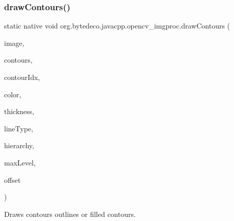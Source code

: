 \subsubsection{\texorpdfstring{draw\+Contours()}{drawContours()}}
{\footnotesize\ttfamily static native void org.\+bytedeco.\+javacpp.\+opencv\+\_\+imgproc.\+draw\+Contours (\begin{DoxyParamCaption}\item[{@By\+Val Mat}]{image,  }\item[{@By\+Val Mat\+Vector}]{contours,  }\item[{int}]{contour\+Idx,  }\item[{@Const @By\+Ref Scalar}]{color,  }\item[{int}]{thickness,  }\item[{int}]{line\+Type,  }\item[{@By\+Val(null\+Value=\char`\"{}cv\+::\+Input\+Array(cv\+::no\+Array())\char`\"{}) Mat}]{hierarchy,  }\item[{int}]{max\+Level,  }\item[{@By\+Val(null\+Value=\char`\"{}cv\+::\+fr.antproject.utils.Point()\char`\"{}) fr.antproject.utils.Point}]{offset }\end{DoxyParamCaption})\hspace{0.3cm}{\ttfamily [static]}}



Draws contours outlines or filled contours. 

